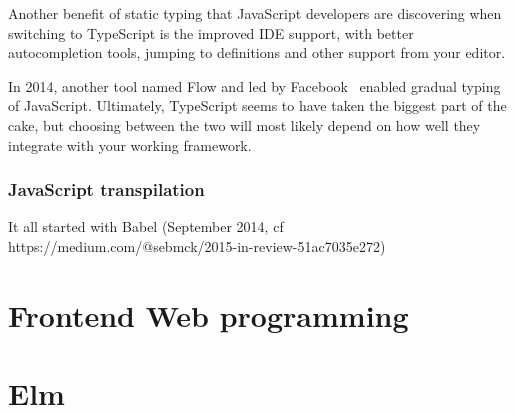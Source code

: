 Another benefit of static typing that JavaScript developers are discovering when
switching to TypeScript is the improved IDE support,
with better autocompletion tools, jumping to definitions and other support from your editor.

In 2014, another tool named Flow and led by Facebook~\cite{chaudhuri2017fast}
enabled gradual typing of JavaScript.
Ultimately, TypeScript seems to have taken the biggest part of the cake,
but choosing between the two will most likely depend on how well they integrate
with your working framework.

\subsubsection{JavaScript transpilation}%
\label{ssub:javascript_transpilation}

It all started with Babel (September 2014,
cf https://medium.com/@sebmck/2015-in-review-51ac7035e272)


\section{Frontend Web programming}%
\label{sec:frontend_web_programming}



\section{Elm}%
\label{sec:elm}


